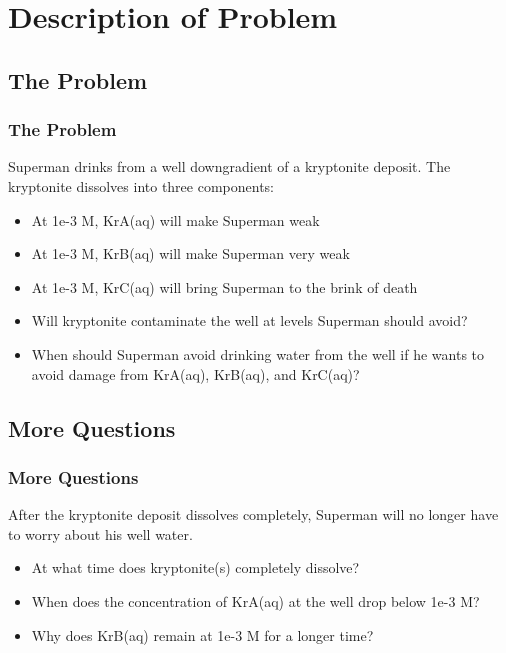 \documentclass{beamer}
\begin{document}
\section{Description of Problem}

\subsection{The Problem}

\begin{frame}[fragile]\frametitle{The Problem}
Superman drinks from a well downgradient of a kryptonite deposit. The kryptonite dissolves into three components:

\begin{itemize}
  \item At 1e-3 M, KrA(aq) will make Superman weak
  \item At 1e-3 M, KrB(aq) will make Superman very weak
  \item At 1e-3 M, KrC(aq) will bring Superman to the brink of death
\end{itemize}

\begin{itemize}
  \item Will kryptonite contaminate the well at levels Superman should avoid? 
  \item When should Superman avoid drinking water from the well if he wants to avoid damage from KrA(aq), KrB(aq), and KrC(aq)?
\end{itemize}

\end{frame}

\subsection{More Questions}

\begin{frame}[fragile]\frametitle{More Questions}
After the kryptonite deposit dissolves completely, Superman will no longer have to worry about his well water.

\begin{itemize}
  \item At what time does kryptonite(s) completely dissolve?
  \item When does the concentration of KrA(aq) at the well drop below 1e-3 M?
  \item Why does KrB(aq) remain at 1e-3 M for a longer time?
\end{itemize}

\end{frame}
\end{document}
